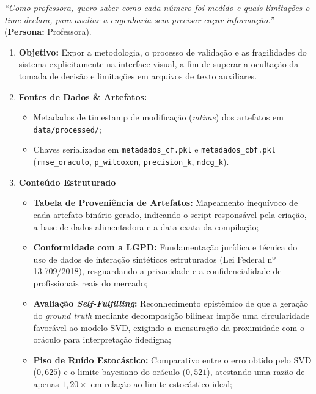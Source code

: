 \begin{tcolorbox}[userstorybox, title={User Story Vinculada (Fluxo 5)}]
\textit{``Como professora, quero saber como cada número foi medido e quais limitações o time declara, para avaliar a engenharia sem precisar caçar informação.''} (\textbf{Persona:} Professora).
\end{tcolorbox}

\begin{enumerate}[label=\textbf{\arabic*.}]
    \item \textbf{Objetivo:} Expor a metodologia, o processo de validação e as fragilidades do sistema explicitamente na interface visual, a fim de superar a ocultação da tomada de decisão e limitações em arquivos de texto auxiliares.
    \item \textbf{Fontes de Dados \& Artefatos:}
    \begin{itemize}
        \item Metadados de timestamp de modificação (\textit{mtime}) dos artefatos em \texttt{data/processed/};
        \item Chaves serializadas em \texttt{metadados\_cf.pkl} e \texttt{metadados\_cbf.pkl} (\texttt{rmse\_oraculo}, \texttt{p\_wilcoxon}, \texttt{precision\_k}, \texttt{ndcg\_k}).
    \end{itemize}
    \item \textbf{Conteúdo Estruturado}
    \begin{itemize}
        \item \textbf{Tabela de Proveniência de Artefatos:} Mapeamento inequívoco de cada artefato binário gerado, indicando o script responsável pela criação, a base de dados alimentadora e a data exata da compilação;
        \item \textbf{Conformidade com a LGPD:} Fundamentação jurídica e técnica do uso de dados de interação sintéticos estruturados (Lei Federal nº 13.709/2018), resguardando a privacidade e a confidencialidade de profissionais reais do mercado;
        \item \textbf{Avaliação \textit{Self-Fulfilling}:} Reconhecimento epistêmico de que a geração do \textit{ground truth} mediante decomposição bilinear impõe uma circularidade favorável ao modelo SVD, exigindo a mensuração da proximidade com o oráculo para interpretação fidedigna;
        \item \textbf{Piso de Ruído Estocástico:} Comparativo entre o erro obtido pelo SVD ($0{,}625$) e o limite bayesiano do oráculo ($0{,}521$), atestando uma razão de apenas $1{,}20\times$ em relação ao limite estocástico ideal;

\end{itemize}
\end{enumerate}
